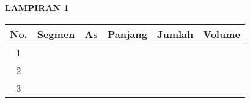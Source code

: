 \clearpage
\appendix %
\renewcommand{\thechapter}{\arabic{chapter}} %

\begin{center}
{\fontsize{14pt}{14pt}\selectfont \textbf{LAMPIRAN 1}} \\[1.5cm]
\end{center}



\renewcommand{\arraystretch}{1.2}

\noindent
\begin{tabularx}{\textwidth}{|c|>{\centering\arraybackslash}X|
                                    >{\centering\arraybackslash}X|
                                    >{\centering\arraybackslash}X|
                                    >{\centering\arraybackslash}X|
                                    >{\centering\arraybackslash}X|}
\hline
No. & Segmen & As & Panjang & Jumlah & Volume \\
\hline
1 & & & & & \\
\hline
2 & & & & & \\
\hline
3 & & & & & \\
\hline
\end{tabularx}
